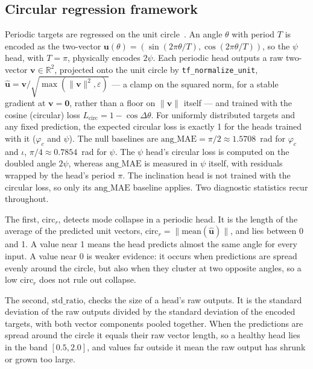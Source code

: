 \subsection{Circular regression framework}
\label{sec:phicpsi:circular}

Periodic targets are regressed on the unit circle~\cite{mardia2000circular}.
An angle $\theta$ with period $T$ is encoded as the two-vector $\mathbf{u}(\theta) = (\sin(2\pi\theta/T), \cos(2\pi\theta/T))$, so the $\psi$ head, with $T=\pi$, physically encodes $2\psi$.
Each periodic head outputs a raw two-vector $\mathbf{v}\in\mathbb{R}^2$, projected onto the unit circle by \texttt{tf\_normalize\_unit}, $\hat{\mathbf{u}} = \mathbf{v}/\sqrt{\max(\|\mathbf{v}\|^2,\varepsilon)}$ --- a clamp on the squared norm, for a stable gradient at $\mathbf{v}=\mathbf{0}$, rather than a floor on $\|\mathbf{v}\|$ itself --- and trained with the cosine (circular) loss $L_{\text{circ}} = 1 - \cos\Delta\theta$.
For uniformly distributed targets and any fixed prediction, the expected circular loss is exactly 1 for the heads trained with it ($\varphi_c$ and $\psi$).
The null baselines are $\text{ang\_MAE} = \pi/2 \approx 1.5708$~rad for $\varphi_c$ and $\iota$, $\pi/4 \approx 0.7854$~rad for $\psi$.
The $\psi$ head's circular loss is computed on the doubled angle $2\psi$, whereas $\text{ang\_MAE}$ is measured in $\psi$ itself, with residuals wrapped by the head's period $\pi$.
The inclination head is not trained with the circular loss, so only its $\text{ang\_MAE}$ baseline applies.
Two diagnostic statistics recur throughout.

The first, $\text{circ}_r$, detects mode collapse in a periodic head.
It is the length of the average of the predicted unit vectors, $\text{circ}_r = \|\text{mean}(\hat{\mathbf{u}})\|$, and lies between 0 and 1.
A value near 1 means the head predicts almost the same angle for every input.
A value near 0 is weaker evidence: it occurs when predictions are spread evenly around the circle, but also when they cluster at two opposite angles, so a low $\text{circ}_r$ does not rule out collapse.

The second, $\text{std\_ratio}$, checks the size of a head's raw outputs.
It is the standard deviation of the raw outputs divided by the standard deviation of the encoded targets, with both vector components pooled together.
When the predictions are spread around the circle it equals their raw vector length, so a healthy head lies in the band $[0.5, 2.0]$, and values far outside it mean the raw output has shrunk or grown too large.

